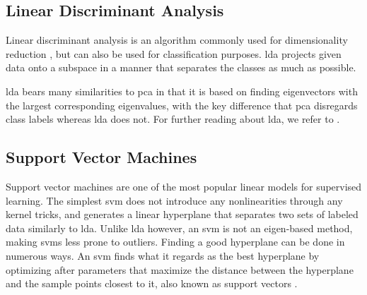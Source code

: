 


\subsection{Linear Discriminant Analysis}

Linear discriminant analysis is an algorithm commonly used for dimensionality reduction \citep{raschka_2014}, but can also be used for classification purposes. \gls{lda} projects given data onto a subspace in a manner that separates the classes as much as possible. 

\gls{lda} bears many similarities to \gls{pca} in that it is based on finding eigenvectors with the largest corresponding eigenvalues, with the key difference that \gls{pca} disregards class labels whereas \gls{lda} does not. For further reading about \gls{lda}, we refer to \citep{raschka_2014}.



\subsection{Support Vector Machines}

Support vector machines are one of the most popular linear models for supervised learning. The simplest \gls{svm} does not introduce any nonlinearities through any kernel tricks, and generates a linear hyperplane that separates two sets of labeled data similarly to \gls{lda}. Unlike \gls{lda} however, an \gls{svm} is not an eigen-based method, making \gls{svm}s less prone to outliers. Finding a good hyperplane can be done in numerous ways. An \gls{svm} finds what it regards as the best hyperplane by optimizing after parameters that maximize the distance between the hyperplane and the sample points closest to it, also known as support vectors \citep{boswell_2002}. 



